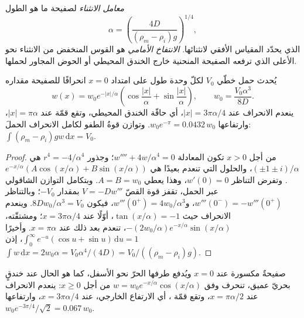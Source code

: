 \begin{definition}\label{def:b3:gravity-geodesy:alpha}
\emph{معامل الانثناء} لصفيحة ما هو
الطول
\[
  \alpha = \left(\frac{4D}{(\rho_m - \rho_i)g}\right)^{1/4},
\]
الذي يحدّد المقياس الأفقي لانثنائها. \emph{الانتفاخ الأمامي} هو
القوس المنخفض من الانثناء نحو الأعلى الذي ترفعه الصفيحة المنحنية خارج الخندق المحيطي أو
الحوض المجاور لحملها.
\end{definition}

\begin{proposition}\label{prop:b3:gravity-geodesy:line}
يُحدث حمل خطّي $V_0$ لكلّ وحدة طول على امتداد $x = 0$ انحرافًا للصفيحة مقداره
\[
  w(x) = w_0e^{-|x|/\alpha}\left(\cos\frac{|x|}{\alpha} + \sin\frac{|x|}{\alpha}\right),
  \qquad w_0 = \frac{V_0\alpha^3}{8D} .
\]
ينعدم الانحراف عند $|x| = 3\pi\alpha/4$، أي حافّة الخندق المحيطي، وتقع
قمّة  عند $|x| = \pi\alpha$، وارتفاعها $w_0e^{-\pi} =
\num{0.0432}\,w_0$. وتوازن قوةُ الطفو لكامل الانحراف الحملَ:
$\int(\rho_m - \rho_i)gw\,\mathrm dx = V_0$.
\end{proposition}

\begin{proof}
من أجل $x > 0$ تكون المعادلة $w'''' + 4w/\alpha^4 = 0$؛ وجذور
$r^4 = -4/\alpha^4$ هي $(\pm1 \pm i)/\alpha$، والحلول التي تنعدم بعيدًا
هي $e^{-x/\alpha}(A\cos(x/\alpha) + B\sin(x/\alpha))$. وتفرض التناظر
$w'(0) = 0$، وهذا يعطي $A = B = w_0$. وبتكامل التوازن الشاقولي عبر
الحمل، تقفز قوة القصّ $V = -Dw'''$ بمقدار $-V_0$؛ وبالتناظر
$w'''(0^-) = -w'''(0^+)$، و$w'''(0^+) = 4w_0/\alpha^3$، فيكون $8Dw_0/\alpha^3 =
V_0$. وينعدم الانحراف حيث $\tan(x/\alpha) =
-1$، أوّلًا عند $x = 3\pi\alpha/4$؛ ومشتقّته،
$-(2w_0/\alpha)e^{-x/\alpha}\sin(x/\alpha)$، تنعدم بعد ذلك عند $x = \pi\alpha$.
وأخيرًا $\int_0^\infty e^{-u}(\cos u + \sin u)\,\mathrm du = 1$، إذن
$\int w\,\mathrm dx = 2w_0\alpha = V_0\alpha^4/(4D) = V_0/((\rho_m - \rho_i)g)$.
\end{proof}

\begin{proposition}\label{prop:b3:gravity-geodesy:broken}
صفيحةٌ مكسورة عند $x = 0$ ويُدفع طرفها الحرّ نحو الأسفل، كما هو الحال عند خندقٍ
بحريّ عميق، تنحرف وفق $w = w_0e^{-x/\alpha}\cos(x/\alpha)$ من أجل $x \ge 0$:
ينعدم الانحراف عند $x = \pi\alpha/2$، وتقع قمّة ،
أي الارتفاع الخارجي، عند $x = 3\pi\alpha/4$، وارتفاعها $w_0e^{-3\pi/4}/\sqrt2 =
\num{0.067}\,w_0$.
\end{proposition}

